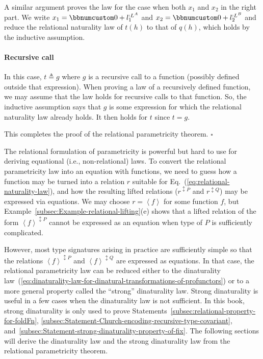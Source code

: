 A similar argument proves the law for the case when both $x_{1}$
and $x_{2}$ in the right part. We write $x_{1}=\bbnum 0+l_{1}^{:L^{A}}$
and $x_{2}=\bbnum 0+l_{2}^{:L^{B}}$ and reduce the relational naturality
law of $t(h)$ to that of $q(h)$, which holds by the inductive assumption.

\paragraph{Recursive call}

In this case, $t\triangleq g$ where $g$ is a recursive call to a
function (possibly defined outside that expression). When proving
a law of a recursively defined function, we may assume that the law
holds for recursive calls to that function. So, the inductive assumption
says that $g$ is some expression for which the relational naturality
law already holds. It then holds for $t$ since $t=g$.

This completes the proof of the relational parametricity theorem.
$\square$ 

The relational formulation of parametricity is powerful but hard to
use for deriving equational (i.e., non-relational) laws. To convert
the relational parametricity law into an equation with functions,
we need to guess how a function may be turned into a relation $r$
suitable for Eq.~(\ref{eq:relational-naturality-law}), and how the
resulting lifted relations ($r^{\updownarrow P}$ and $r^{\updownarrow Q}$)
may be expressed via equations. We may choose $r=\left<f\right>$
for some function $f$, but Example~\ref{subsec:Example-relational-lifting}(e)
shows that a lifted relation of the form $\left<f\right>^{\updownarrow P}$
cannot be expressed as an equation when type of $P$ is sufficiently
complicated.

However, most type signatures arising in practice are sufficiently
simple so that the relations $\left<f\right>^{\updownarrow P}$ and
$\left<f\right>^{\updownarrow Q}$ are expressed as equations. In
that case, the relational parametricity law can be reduced either
to the dinaturality law~(\ref{eq:dinaturality-law-for-dinatural-transformations-of-profunctors})
or to a more general property called the \textsf{``}strong\textsf{''} dinaturality
law. Strong dinaturality is useful in a few cases when the dinaturality
law is not sufficient. In this book, strong dinaturality is only used
to prove Statements~\ref{subsec:relational-property-for-foldFn},
\ref{subsec:Statement-Church-encoding-recursive-type-covariant},
and~\ref{subsec:Statement-strong-dinaturality-property-of-fix}.
The following sections will derive the dinaturality law and the strong
dinaturality law from the relational parametricity theorem.


